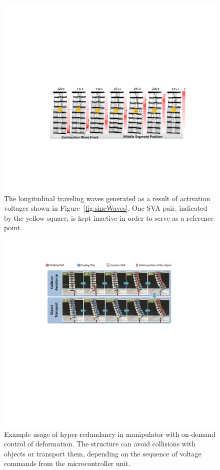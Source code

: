 \begin{figure}[!ht]
\centering
\includegraphics[width=\textwidth]{peristaltic.pdf}
\caption[The longitudinal traveling wave as it propagates through the structure]{The longitudinal traveling waves generated as a result of activation voltages shown in Figure~\ref{fig:sineWaves}. One SVA pair, indicated by the yellow square, is kept inactive in order to serve as a reference point. }
\label{fig:peristaltic}
\end{figure}


\begin{figure}[!ht]
\centering
\includegraphics[width=\textwidth]{unstructured.pdf}
\caption[Dealing with unstructured environments]{Example usage of hyper-redundancy in manipulator with on-demand control of deformation. The structure can avoid collisions with objects or transport them, depending on the sequence of voltage commands from the microcontroller unit.}
\label{fig:unstructured}
\end{figure}

